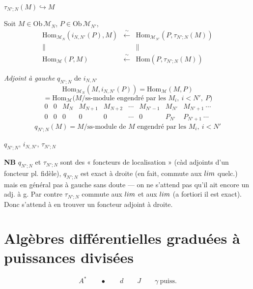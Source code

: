 \documentclass[11pt,a4paper]{article}
\begin{document}
$\tau_{N';N}(M) \hookrightarrow M$

Soit $M \in \mathrm{Ob}\,\mathcal{M}_N$, $P \in \mathrm{Ob}\,\mathcal{M}_{N'}$,
\[
  \begin{array}{ccc}
    \mathrm{Hom}_{\mathcal{M}_N}(i_{N,N'}(P), M) & \xleftarrow{\ \sim\ } & \mathrm{Hom}_{\mathcal{M}_{N'}}(P, \tau_{N';N}(M)) \\
    \| & & \| \\
    \mathrm{Hom}_{\mathcal{M}}(P, M) & \xleftarrow{\ \sim\ } & \mathrm{Hom}(P, \tau_{N';N}(M))
  \end{array}
\]

\emph{Adjoint à gauche} $q_{N';N}$ de $i_{N,N'}$
\[
  \mathrm{Hom}_{\mathcal{M}_N}(M, i_{N,N'}(P)) = \mathrm{Hom}_{\mathcal{M}}(M, P)
\]
\[
  = \mathrm{Hom}_{\mathcal{M}}\bigl(M/\text{ss-module engendré par les } M_i,\ i<N',\ P\bigr)
\]
\[
  \begin{array}{ccccccccc}
    0 & 0 & M_N & M_{N+1} & M_{N+2} & \cdots & M_{N'-1} & M_{N'} & M_{N'+1} \ \cdots \\
    0 & 0 & 0 & 0 & 0 & \cdots & 0 & P_{N'} & P_{N'+1} \ \cdots
  \end{array}
\]
\[
  q_{N';N}(M) = M/\text{ss-module de } M \text{ engendré par les } M_i,\ i < N'
\]

$q_{N';N}$, $i_{N,N'}$, $\tau_{N';N}$

\textbf{NB} $q_{N';N}$ et $\tau_{N';N}$ sont des « foncteurs de localisation » (càd adjoints d'un foncteur pl. fidèle),  $q_{N';N}$ est exact à droite (en fait, commute aux $\varinjlim$ quelc.) mais en général pas à gauche sans doute --- on ne s'attend pas qu'il ait encore un adj. à g. Par contre $\tau_{N';N}$ commute aux $\varprojlim$ et aux $\varinjlim$ (a fortiori il est exact). Donc s'attend à en trouver un foncteur adjoint à droite.

\section{Algèbres différentielles graduées à puissances divisées}

\[
  A^* \qquad \bullet \qquad d \qquad J \qquad \gamma \ \text{puiss.}
\]
\end{document}
